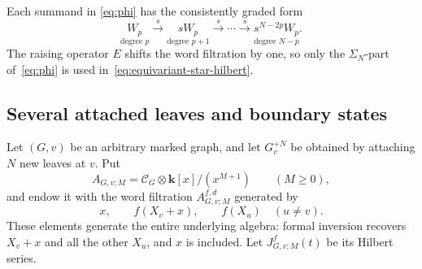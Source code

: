 \documentclass[reqno]{article}
\theoremstyle{plain} %
\theoremstyle{definition}
\theoremstyle{remark}
\newcommand{\K} {\mathbf{k}}
\newcommand {\CC}{\mathscr{C}}
\numberwithin{equation}{section}
\begin{document}
Each summand in \eqref{eq:phi} has the consistently graded form
\[
 \underset{\text{degree }p}{W_p}
 \xrightarrow{\ s\ }
 \underset{\text{degree }p+1}{sW_p}
 \xrightarrow{\ s\ }\cdots\xrightarrow{\ s\ }
 \underset{\text{degree }N-p}{s^{N-2p}W_p}.
\]
The raising operator $E$ shifts the word filtration by one, so only the
$\Sigma_N$-part of~\eqref{eq:phi} is used in~\eqref{eq:equivariant-star-hilbert}.

\subsection{Several attached leaves and boundary states}
\label{sec:pendant-compression}

Let $(G,v)$ be an arbitrary marked graph, and let $G_v^{+N}$ be obtained
by attaching $N$ new leaves at $v$. Put
\begin{equation}\label{eq:decorated-core-algebra}
 A_{G,v;M}=\CC_G\otimes\K[x]/(x^{M+1})
 \qquad(M\ge0),
\end{equation}
and endow it with the word filtration $A_{G,v;M}^{f,d}$ generated by
\begin{equation}\label{eq:decorated-core-generators}
 x,\qquad f(X_v+x),\qquad f(X_u)\quad(u\ne v).
\end{equation}
These elements generate the entire underlying algebra: formal inversion
recovers $X_v+x$ and all the other $X_u$, and $x$ is included.
Let $J_{G,v;M}^f(t)$ be its Hilbert series.
\end{document}
